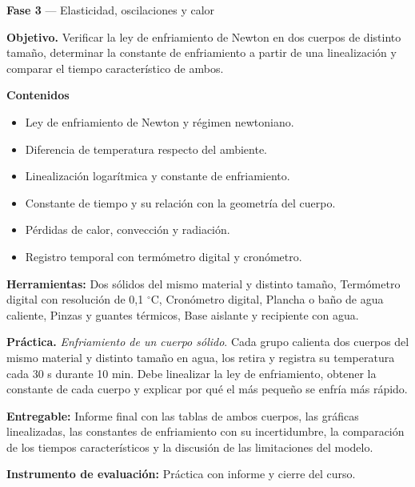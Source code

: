 \documentclass[11pt,a4paper]{article}
\begin{document}
\begin{tcolorbox}[cajaContenido,title={Semana 10 --- Enfriamiento de un cuerpo sólido}]
\textbf{Fase 3} --- Elasticidad, oscilaciones y calor

\textbf{Objetivo.} Verificar la ley de enfriamiento de Newton en dos cuerpos de distinto tamaño, determinar la constante de enfriamiento a partir de una linealización y comparar el tiempo característico de ambos.

\textbf{Contenidos}

\begin{itemize}[leftmargin=1.4em,itemsep=2pt,topsep=3pt]
  \item Ley de enfriamiento de Newton y régimen newtoniano.
  \item Diferencia de temperatura respecto del ambiente.
  \item Linealización logarítmica y constante de enfriamiento.
  \item Constante de tiempo y su relación con la geometría del cuerpo.
  \item Pérdidas de calor, convección y radiación.
  \item Registro temporal con termómetro digital y cronómetro.
\end{itemize}

\textbf{Herramientas:} Dos sólidos del mismo material y distinto tamaño, Termómetro digital con resolución de 0,1 $^{\circ}$C, Cronómetro digital, Plancha o baño de agua caliente, Pinzas y guantes térmicos, Base aislante y recipiente con agua.

\textbf{Práctica.} \emph{Enfriamiento de un cuerpo sólido}. Cada grupo calienta dos cuerpos del mismo material y distinto tamaño en agua, los retira y registra su temperatura cada 30 s durante 10 min. Debe linealizar la ley de enfriamiento, obtener la constante de cada cuerpo y explicar por qué el más pequeño se enfría más rápido.

\textbf{Entregable:} Informe final con las tablas de ambos cuerpos, las gráficas linealizadas, las constantes de enfriamiento con su incertidumbre, la comparación de los tiempos característicos y la discusión de las limitaciones del modelo.

\textbf{Instrumento de evaluación:} Práctica con informe y cierre del curso.
\end{tcolorbox}
\end{document}
